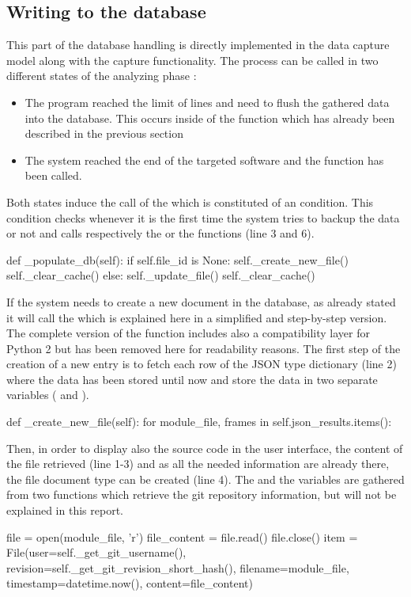 \subsection{Writing to the database}
This part of the database handling is directly implemented in the data capture model along with the capture functionality. The process can be called in two different states of the analyzing phase : 
\begin{itemize}
  \item The program reached the limit of lines and need to flush the gathered data into the database. This occurs inside of the  function which has already been described in the previous section
  \item The system reached the end of the targeted software and the function  has been called.
\end{itemize}
Both states induce the call of the  which is constituted of an  condition. This condition checks whenever it is the first time the system tries to backup the data or not and calls respectively the  or the  functions (line 3 and 6).
\begin{python}
def _populate_db(self):
    if self.file_id is None:
        self._create_new_file()
        self._clear_cache()
    else:
        self._update_file()
        self._clear_cache()
\end{python}

If the system needs to create a new document in the database, as already stated it will call the  which is explained here in a simplified and step-by-step version. The complete version of the function includes also a compatibility layer for Python 2 but has been removed here for readability reasons. The first step of the creation of a new entry is to fetch each row of the JSON type dictionary (line 2) where the data has been stored until now and store the data in two separate variables ( and ).
\begin{python}
def _create_new_file(self):
  for module_file, frames in self.json_results.items():
\end{python}
 
Then, in order to display also the source code in the user interface, the content of the file retrieved (line 1-3) and as all the needed information are already there, the file document type can be created (line 4). The  and the  variables are gathered from two functions which retrieve the git repository information, but will not be explained in this report.
\begin{python}
file = open(module_file, 'r')
file_content = file.read()
file.close()
item = File(user=self._get_git_username(), revision=self._get_git_revision_short_hash(), filename=module_file, timestamp=datetime.now(), content=file_content)
\end{python}


